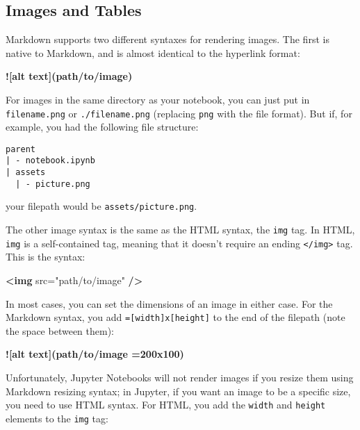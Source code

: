 \documentclass[11pt]{article}
\newenvironment{Shaded}{}{}
\newcommand{\KeywordTok}[1]{\textcolor[rgb]{0.00,0.44,0.13}{\textbf{{#1}}}}
\newcommand{\StringTok}[1]{\textcolor[rgb]{0.25,0.44,0.63}{{#1}}}
\newcommand{\OtherTok}[1]{\textcolor[rgb]{0.00,0.44,0.13}{{#1}}}
\newcommand{\AlertTok}[1]{\textcolor[rgb]{1.00,0.00,0.00}{\textbf{{#1}}}}
\begin{document}
    \hypertarget{images}{}

\hypertarget{images-and-tables}{%
\subsection{Images and Tables}\label{images-and-tables}}

Markdown supports two different syntaxes for rendering images. The first
is native to Markdown, and is almost identical to the hyperlink format:

\begin{Shaded}
\begin{Highlighting}[]
\AlertTok{![alt text](path/to/image)}
\end{Highlighting}
\end{Shaded}

For images in the same directory as your notebook, you can just put in
\texttt{filename.png} or \texttt{./filename.png} (replacing \texttt{png}
with the file format). But if, for example, you had the following file
structure:

\begin{verbatim}
parent
| - notebook.ipynb
| assets
  | - picture.png
\end{verbatim}

your filepath would be \texttt{assets/picture.png}.

The other image syntax is the same as the HTML syntax, the \texttt{img}
tag. In HTML, \texttt{img} is a self-contained tag, meaning that it
doesn't require an ending \texttt{\textless{}/img\textgreater{}} tag.
This is the syntax:

\begin{Shaded}
\begin{Highlighting}[]
\KeywordTok{<img}\OtherTok{ src=}\StringTok{"path/to/image"} \KeywordTok{/>}
\end{Highlighting}
\end{Shaded}

In most cases, you can set the dimensions of an image in either case.
For the Markdown syntax, you add \texttt{={[}width{]}x{[}height{]}} to
the end of the filepath (note the space between them):

\begin{Shaded}
\begin{Highlighting}[]
\AlertTok{![alt text](path/to/image =200x100)}
\end{Highlighting}
\end{Shaded}

Unfortunately, Jupyter Notebooks will not render images if you resize
them using Markdown resizing syntax; in Jupyter, if you want an image to
be a specific size, you need to use HTML syntax. For HTML, you add the
\texttt{width} and \texttt{height} elements to the \texttt{img} tag:
\end{document}
